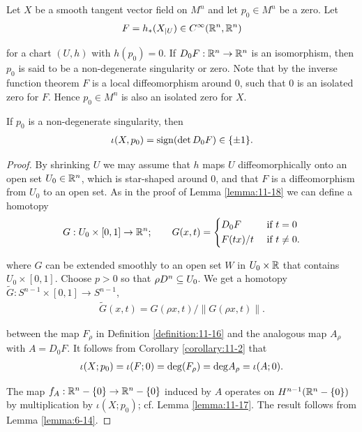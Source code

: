 Let $X$ be a smooth tangent vector field on $M^n$ and let $p_0\in M^n$ be a zero. Let
\begin{align*}
  F = h_*(X_{|U})\in C^\infty({\mathbb{R}}^n, {\mathbb{R}}^n)
\end{align*}

for a chart $(U, h)$ with $h(p_0) = 0$. If $D_0F:{\mathbb{R}}^n\to{\ensuremath{\mathbb{R}}}^n$ is an isomorphism, then
$p_0$ is said to be a non-degenerate singularity or zero. Note that by the inverse
function theorem $F$ is a local diffeomorphism around 0, such that 0 is an isolated
zero for $F$. Hence $p_0\in M^n$ is also an isolated zero for $X$.

\begin{lemma}\label{lemma:11-20}
  If $p_0$ is a non-degenerate singularity, then
  \begin{align*}
    \iota(X, p_0) = \mathrm{sign}(\det D_0F)\in \{\pm 1\}.
  \end{align*}
\end{lemma}

\begin{proof}
  By shrinking $U$ we may assume that $h$ maps $U$ diffeomorphically onto an
open set $U_0\in{\ensuremath{\mathbb{R}}}^n$, which is star-shaped around 0, and that $F$ is a diffeomorphism
from $U_0$ to an open set. As in the proof of Lemma \ref{lemma:11-18} we can define a homotopy
\begin{align*}
  G:U_0\times[0, 1]\to{\ensuremath{\mathbb{R}}}^n; \qquad G(x, t) = \left\{\begin{aligned}
    & D_0F   && \text{ if } t = 0 \\
    & F(tx)/t && \text{ if } t\neq 0.
  \end{aligned}\right.
\end{align*}

where $G$ can be extended smoothly to an open set $W$ in $U_0\times {\ensuremath{\mathbb{R}}}$ that contains
$U_0\times [0,1]$. Choose $p > 0$ so that $\rho D^n\subseteq U_0$. We get a homotopy $\tilde{G}:
S^{n-1}\times[0, 1]\to S^{n-1}$,
\begin{align*}
  \tilde{G}(x, t) = G(\rho x, t)\big/ \|G(\rho x, t)\|.
\end{align*}

between the map $F_\rho$ in Definition \ref{definition:11-16} and the analogous map $A_\rho$ with $A=D_0F$.
It follows from Corollary \ref{corollary:11-2} that
\begin{align*}
  \iota(X; p_0) = \iota(F; 0) 
  = \mathrm{deg}(F_\rho) = \mathrm{deg}A_\rho  
  = \iota(A; 0).
\end{align*}

The map $f_A:{\mathbb{R}}^n-\{0\}\to {\ensuremath{\mathbb{R}}}^n-\{0\}$ induced by $A$ operates on $H^{n-1}({\mathbb{R}}^n-\{0\})$ by 
multiplication by $\iota(X; p_0)$; cf. Lemma \ref{lemma:11-17}. The result follows from 
Lemma \ref{lemma:6-14}.
\end{proof}

